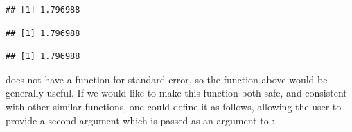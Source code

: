 \documentclass[krantz2]{krantz}\usepackage{knitr}%
\begin{document}
\begin{knitrout}\footnotesize
{}\color{fgcolor}\begin{kframe}
\begin{alltt}
 \hlkwb{<-} \hlstd{(}\hlstd{) \{}
 \hlstd{(} \hlstd{=}\hlstd{)}\hlopt{/}\hlstd{(}
\hlstd{\}}
 \hlkwb{<-} \hlstd{(}\hlstd{,} \hlstd{,} \hlstd{,} \hlopt{-}\hlstd{)}
 \hlkwb{<-}  \hlstd{)}
\hlstd{(}
\end{alltt}
\begin{verbatim}
## [1] 1.796988
\end{verbatim}
\begin{alltt}
\end{alltt}
\begin{verbatim}
## [1] 1.796988
\end{verbatim}
\begin{alltt}
\end{alltt}
\begin{verbatim}
## [1] 1.796988
\end{verbatim}
\end{kframe}
\end{knitrout}

\Rlang does not have a function for standard error, so the function above would be generally useful. If we would like to make this function both safe, and consistent with other similar \Rlang functions, one could define it as follows, allowing the user to provide a second argument which is passed as an argument to :
\end{document}

